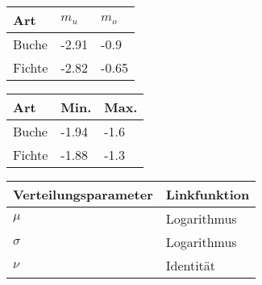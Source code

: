 \section*{}

\begin{frame}[plain]
  \begin{center}
    \begin{minipage}{0.33\linewidth}
      \begin{tabular}{l l l}
        \toprule
        Art & \(m_u\) & \(m_o\) \\
        \midrule
        Buche & -2.91 & -0.9 \\
        Fichte & -2.82 & -0.65 \\
        \bottomrule
      \end{tabular}
    \end{minipage}
  \end{center}
  
  \begin{center}
    \begin{minipage}{0.32\linewidth}
      \begin{tabular}{l l l}
        \toprule
        Art & Min. & Max. \\
        \midrule
        Buche & -1.94 & -1.6 \\
        Fichte & -1.88 & -1.3 \\
        \bottomrule
      \end{tabular}
    \end{minipage}
  \end{center}

  \begin{center}
    \begin{minipage}{0.4\linewidth}
      {\scriptsize
        \begin{tabular}{l l}
          \toprule
          Verteilungsparameter & Linkfunktion \\
          \midrule
          \(\mu\) & Logarithmus \\
          \(\sigma\) & Logarithmus \\
          \(\nu\) & Identität \\
          \bottomrule
        \end{tabular}}
    \end{minipage}
  \end{center}
\end{frame}

